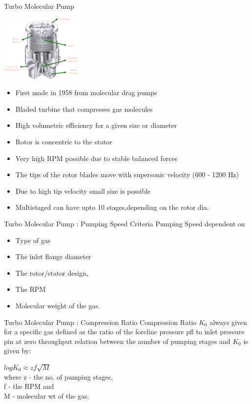 \documentclass[11]{beamer}
\begin{document}
\begin{frame}{Turbo Molecular Pump}
\begin{center}
\includegraphics[width=0.3\textwidth]{TurboPump_marked.png}
\end{center}

\begin{itemize}
 \item First made in 1958 from molecular drag pumps
 \item Bladed turbine that compresses gas molecules
 \item High volumetric efficiency for a given size or diameter
 \item Rotor is concentric to the stator
 \item Very high RPM possible due to stable balanced forces
 \item The tips of the rotor blades move with supersonic velocity (600 - 1200 Hz)
 \item  Due to high tip velocity small size is possible
 \item Multistaged can have upto 10 stages,depending on the rotor dia.
\end{itemize}

\end{frame}


\begin{frame}{Turbo Molecular Pump : Pumping Speed Criteria}
Pumping Speed dependent on 
\begin{itemize}
 \item  Type of gas 
  \item     The inlet flange diameter
    \item   The rotor/stator design, 
      \item The RPM  
      \item  Molecular weight of the gas.
 
\end{itemize}
\end{frame}

\begin{frame}{Turbo Molecular Pump : Compression Ratio}
Compression Ratio $K_0$
       always given for a specific gas
       defined as the ratio of the foreline pressure pfl to inlet pressure pin at zero throughput
       relation between the number of pumping stages and $K_0$   
 is given by:

                  $log K_{0} \approx z f \sqrt{M} $\\
       where z - the no. of pumping stages,\\
                    f - the RPM and \\
                   M - molecular wt of the gas.
\end{frame}
\end{document}
